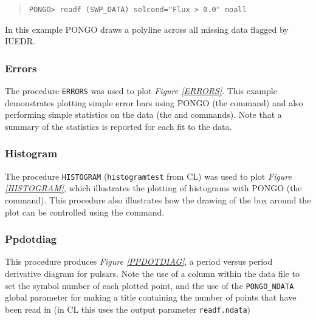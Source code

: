 \begin{quote}
\begin{verbatim}
PONGO> readf (SWP_DATA) selcond="Flux > 0.0" noall
\end{verbatim}
\end{quote}

In this example PONGO draws a polyline across all missing data flagged by
IUEDR.

\newpage


\subsubsection{Errors}

The procedure \verb+ERRORS+ was used to plot {\em Figure
\ref{ERRORS}}.  This example demonstrates plotting simple error
bars using PONGO (the  command) and also
performing simple statistics on the data (the 
and  commands).  Note that a summary of the
statistics is reported for each fit to the data.

\newpage


\subsubsection{Histogram}

The procedure \verb+HISTOGRAM+ (\verb+histogramtest+ from CL) was used to
plot {\em Figure \ref{HISTOGRAM}}, which illustrates the plotting
of histograms with PONGO (the  command).  This
procedure also illustrates how the drawing of the box around the plot
can be controlled using the  command.

\newpage


\subsubsection{Ppdotdiag}

This procedure produces {\em Figure \ref{PPDOTDIAG}}, a period
versus period derivative diagram for pulsars.  Note the use of a
column within the data file to set the symbol number of each plotted
point, and the use of the \verb+PONGO_NDATA+ global parameter for
making a title containing the number of points that have been read in
(in CL this uses the output parameter \verb+readf.ndata+)

